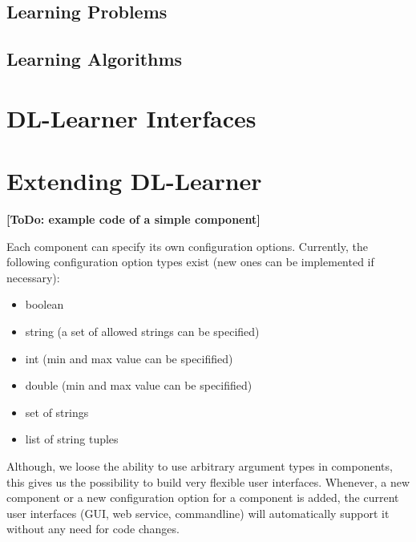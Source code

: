 \documentclass[a4paper,12pt]{scrartcl}
\newcommand{\todo}[1]{\textbf{[ToDo: #1]}}
\begin{document}
\subsection{Learning Problems}

\subsection{Learning Algorithms}

\section{DL-Learner Interfaces}

\section{Extending DL-Learner}
\label{sec:developing}

\todo{example code of a simple component}

Each component can specify its own configuration options. Currently, the following configuration option types exist (new ones can be implemented if necessary):

\begin{itemize}
 \item boolean
 \item string (a set of allowed strings can be specified)
 \item int (min and max value can be specifified)
 \item double (min and max value can be specifified)
 \item set of strings
 \item list of string tuples
\end{itemize}

Although, we loose the ability to use arbitrary argument types in components, this gives us the possibility to build very flexible user interfaces. Whenever, a new component or a new configuration option for a component is added, the current user interfaces (GUI, web service, commandline) will automatically support it without any need for code changes.



\end{document}
